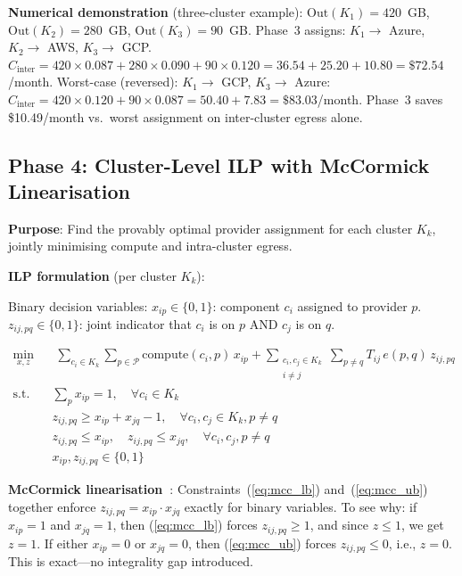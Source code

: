 \documentclass[10pt,journal]{IEEEtran}
\begin{document}
\textbf{Numerical demonstration} (three-cluster example):
$\text{Out}(K_1) = 420$~GB, $\text{Out}(K_2) = 280$~GB, $\text{Out}(K_3) = 90$~GB.
Phase~3 assigns: $K_1 \to$ Azure, $K_2 \to$ AWS, $K_3 \to$ GCP.
$C_{\text{inter}} = 420 \times 0.087 + 280 \times 0.090 + 90 \times 0.120
= 36.54 + 25.20 + 10.80 = \$72.54$/month.
Worst-case (reversed): $K_1 \to$ GCP, $K_3 \to$ Azure:
$C_{\text{inter}} = 420 \times 0.120 + 90 \times 0.087 = 50.40 + 7.83 = \$83.03$/month.
Phase~3 saves \$10.49/month vs.\ worst assignment on inter-cluster egress alone.

\subsection{Phase 4: Cluster-Level ILP with McCormick Linearisation}

\textbf{Purpose}: Find the provably optimal provider assignment for each cluster
$K_k$, jointly minimising compute and intra-cluster egress.

\textbf{ILP formulation} (per cluster $K_k$):

Binary decision variables:
$x_{ip} \in \{0,1\}$: component $c_i$ assigned to provider $p$.
$z_{ij,pq} \in \{0,1\}$: joint indicator that $c_i$ is on $p$ AND $c_j$ is on $q$.

\begin{align}
\min_{x,z} &\;
  \sum_{c_i \in K_k}\sum_{p \in \mathcal{P}} \text{compute}(c_i,p)\,x_{ip}
  + \sum_{\substack{c_i,c_j \in K_k \\ i \neq j}}\sum_{p \neq q} T_{ij}\,e(p,q)\,z_{ij,pq}
\label{eq:ilp}\\
\text{s.t.}\quad &
  \sum_{p} x_{ip} = 1, \quad\forall c_i \in K_k
\label{eq:c1}\\
& z_{ij,pq} \geq x_{ip} + x_{jq} - 1, \quad\forall c_i,c_j \in K_k, p \neq q
\label{eq:mcc_lb}\\
& z_{ij,pq} \leq x_{ip}, \quad z_{ij,pq} \leq x_{jq}, \quad\forall c_i,c_j,p \neq q
\label{eq:mcc_ub}\\
& x_{ip}, z_{ij,pq} \in \{0,1\}
\label{eq:binary}
\end{align}

\textbf{McCormick linearisation~\cite{mccormick1976}}:
Constraints~(\ref{eq:mcc_lb}) and~(\ref{eq:mcc_ub}) together enforce
$z_{ij,pq} = x_{ip} \cdot x_{jq}$ exactly for binary variables.
To see why: if $x_{ip}=1$ and $x_{jq}=1$, then (\ref{eq:mcc_lb}) forces
$z_{ij,pq} \geq 1$, and since $z \leq 1$, we get $z=1$.
If either $x_{ip}=0$ or $x_{jq}=0$, then (\ref{eq:mcc_ub}) forces $z_{ij,pq} \leq 0$,
i.e., $z=0$. This is exact---no integrality gap introduced.
\end{document}
